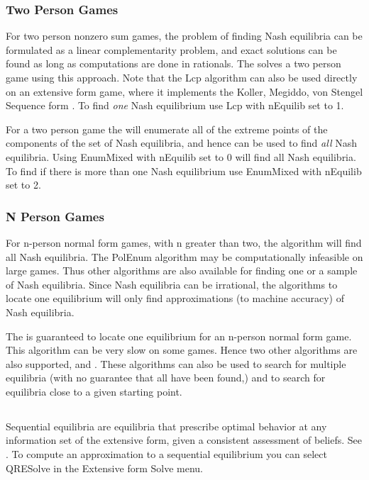 \documentclass[12pt]{report}
\begin{document}
\subsubsection{Two Person Games}\label{twopersec}
For two person nonzero sum games, the problem of finding Nash
equilibria can be formulated as a linear complementarity problem, and
exact solutions can be found as long as computations are done in
rationals.  The  solves a two person game
using this approach.  Note that the Lcp algorithm can also be used
directly on an extensive form game, where it implements the Koller,
Megiddo, von Stengel Sequence form \cite{KolMegSte:94}.  To find {\em 
one} Nash equilibrium use Lcp with nEquilib set to 1.

For a two person game the  
will enumerate all of the extreme points of the components of the set
of Nash equilibria, and hence can be used to find {\em all} Nash
equilibria.  Using EnumMixed with nEquilib set to 0 will find all Nash
equilibria.  To find if there is more than one Nash equilibrium use
EnumMixed with nEquilib set to 2.

\subsubsection{N Person Games}\label{npernashsec}
For n-person normal form games, with n greater than two, the
 algorithm will find all Nash
equilibria. The PolEnum algorithm may be computationally infeasible on
large games.  Thus other algorithms are also available for finding one
or a sample of Nash equilibria.  Since Nash equilibria can be
irrational, the algorithms to locate one equilibrium will only find
approximations (to machine accuracy) of Nash equilibria.

The  is guaranteed to locate one
equilibrium for an n-person normal form game.  This algorithm can be
very slow on some games.  Hence two other algorithms are also
supported,  and .  These
algorithms can also be used to search for multiple equilibria (with no
guarantee that all have been found,) and to search for equilibria
close to a given starting point.

\subsection{}\label{seqnashsec}
Sequential equilibria are equilibria that prescribe optimal behavior
at any information set of the extensive form, given a consistent
assessment of beliefs.  See \cite{KrepsWilson:1982}.  To compute an
approximation to a sequential equilibrium you can select QRESolve in
the Extensive form Solve menu.
\end{document}

